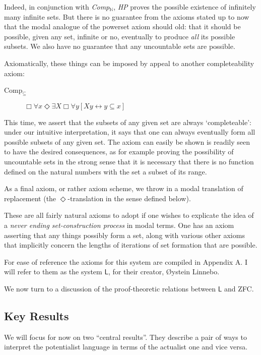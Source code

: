 \documentclass{article}
\begin{document}
Indeed, in conjunction with \emph{ Comp$_\mathbb{N}$}, 
\emph{ HP} proves the possible existence of infinitely many
infinite sets. But there is no guarantee from the axioms stated up to now that 
the modal analogue of the powerset axiom should old: that it should be possible, 
given any set, infinite or no, eventually to produce \emph{all} its possible subsets. 
We also have no guarantee that any uncountable sets are possible.

Axiomatically, these things can be imposed by appeal to another completeability axiom:
\begin{description}
    \item[Comp$_\subseteq$]
    $\Box \forall x \Diamond \exists X \Box \forall y[ Xy \leftrightarrow y \subseteq x]$
\end{description}
This time, we assert that the subsets of any given set are always `completeable': 
under our intuitive interpretation, 
it says that one can always eventually form all possible subsets of any given set. 
The axiom can easily be shown is readily seen to have the desired consequences, as 
for example proving the possibility of uncountable sets in the strong sense that 
it is necessary that there is no function defined on the natural numbers with the set 
a subset of its range.

As a final axiom, or rather axiom scheme, we throw in a modal 
translation of replacement (the $\Diamond$-translation in the sense defined below).

These are all fairly natural axioms to adopt if one wishes to explicate the idea 
of a \emph{never ending set-construction process} in modal terms. One has an axiom 
asserting that any things possibly form a set, along with various other axioms 
that implicitly concern the lengths of iterations of set formation that are possible.

For ease of reference the axioms 
for this system are compiled in Appendix A. I will refer to them as the system $\mathsf{L}$,
for their creator, \O ystein Linnebo.

We now turn to a discussion of the proof-theoretic relations between $\mathsf{L}$
and ZFC. 
\subsection{Key Results}
We will focus for now on two ``central results''. They describe a pair of ways 
to interpret the potentialist language in terms of the actualist one and vice versa.
\end{document}
